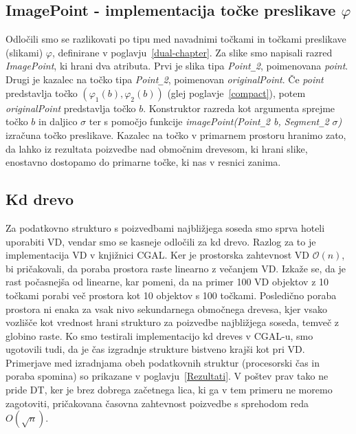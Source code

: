 \documentclass[a4paper, 12pt]{book}
\newcommand{\OO}{\ensuremath{\mathcal{O}}} %
\newcommand{\U}{\texttt{\_}}
\begin{document}
\subsection{ImagePoint - implementacija točke preslikave $\varphi$}
Odločili smo se razlikovati po tipu med navadnimi točkami in točkami preslikave (slikami) $\varphi$, definirane v poglavju~\ref{dual-chapter}. Za slike smo napisali razred \textit{ImagePoint}, ki hrani dva atributa. Prvi je slika tipa \textit{Point\texttt{\_}2}, poimenovana \textit{point}. Drugi je kazalec na točko tipa \textit{Point\texttt{\_}2}, poimenovan \textit{originalPoint}. Če \textit{point} predstavlja točko $(\varphi_1(b), \varphi_2(b))$ (glej poglavje~\ref{compact}), potem \textit{originalPoint} predstavlja točko $b$. Konstruktor razreda kot argumenta sprejme točko $b$ in daljico $\sigma$ ter s pomočjo funkcije \textit{imagePoint(Point\U 2 b, Segment\U 2 $\sigma$)} izračuna točko preslikave. Kazalec na točko v primarnem prostoru hranimo zato, da lahko iz rezultata poizvedbe nad območnim drevesom, ki hrani slike, enostavno dostopamo do primarne točke, ki nas v resnici zanima.

\subsection{Kd drevo}
Za podatkovno strukturo s poizvedbami najbližjega soseda smo sprva hoteli uporabiti VD, vendar smo se kasneje odločili za kd drevo. Razlog za to je implementacija VD v knjižnici CGAL. Ker je prostorska zahtevnost VD $\OO(n)$, bi pričakovali, da poraba prostora raste linearno z večanjem VD. Izkaže se, da je rast počasnejša od linearne, kar pomeni, da na primer 100 VD objektov z 10 točkami porabi več prostora kot 10 objektov s 100 točkami. Posledično poraba prostora ni enaka za vsak nivo sekundarnega območnega drevesa, kjer vsako vozlišče kot vrednost hrani strukturo za poizvedbe najbližjega soseda, temveč z globino raste. Ko smo testirali implementacijo kd dreves v CGAL-u, smo ugotovili tudi, da je čas izgradnje strukture bistveno krajši kot pri VD. Primerjave med izradnjama obeh podatkovnih struktur (procesorski čas in poraba spomina) so prikazane v poglavju~\ref{Rezultati}. V poštev prav tako ne pride DT, ker je brez dobrega začetnega lica, ki ga v tem primeru ne moremo zagotoviti, pričakovana časovna zahtevnost poizvedbe s sprehodom reda $O(\sqrt{n})$.
\end{document}
